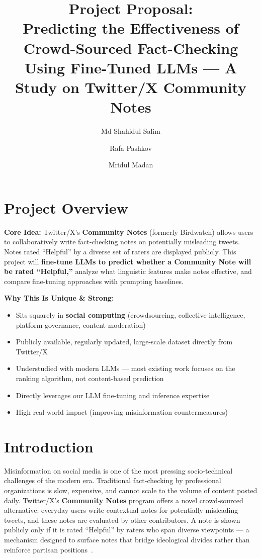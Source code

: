 \documentclass[12pt, a4paper]{article}
\title{
    \textbf{Project Proposal:} \\[0.5em]
    Predicting the Effectiveness of Crowd-Sourced Fact-Checking Using Fine-Tuned LLMs --- A Study on Twitter/X Community Notes
}
\author{Md Shahidul Salim \and Rafa Pashkov \and Mridul Madan}
\date{}
\begin{document}
\maketitle

\section{Project Overview}

\textbf{Core Idea:} Twitter/X's \textbf{Community Notes} (formerly Birdwatch) allows users to collaboratively write fact-checking notes on potentially misleading tweets. Notes rated ``Helpful'' by a diverse set of raters are displayed publicly. This project will \textbf{fine-tune LLMs to predict whether a Community Note will be rated ``Helpful,''} analyze what linguistic features make notes effective, and compare fine-tuning approaches with prompting baselines.

\medskip
\noindent\textbf{Why This Is Unique \& Strong:}
\begin{itemize}[nosep]
    \item Sits squarely in \textbf{social computing} (crowdsourcing, collective intelligence, platform governance, content moderation)
    \item Publicly available, regularly updated, large-scale dataset directly from Twitter/X
    \item Understudied with modern LLMs --- most existing work focuses on the ranking algorithm, not content-based prediction
    \item Directly leverages our LLM fine-tuning and inference expertise
    \item High real-world impact (improving misinformation countermeasures)
\end{itemize}

\section{Introduction}

Misinformation on social media is one of the most pressing socio-technical challenges of the modern era. Traditional fact-checking by professional organizations is slow, expensive, and cannot scale to the volume of content posted daily. Twitter/X's \textbf{Community Notes} program offers a novel crowd-sourced alternative: everyday users write contextual notes for potentially misleading tweets, and these notes are evaluated by other contributors. A note is shown publicly only if it is rated ``Helpful'' by raters who span diverse viewpoints --- a mechanism designed to surface notes that bridge ideological divides rather than reinforce partisan positions~\cite{allen2022}.
\end{document}
